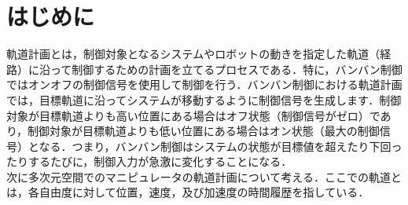 
\section{はじめに}
軌道計画とは，制御対象となるシステムやロボットの動きを指定した軌道（経路）に沿って制御するための計画を立てるプロセスである．特に，バンバン制御ではオンオフの制御信号を使用して制御を行う．バンバン制御における軌道計画では，目標軌道に沿ってシステムが移動するように制御信号を生成します．制御対象が目標軌道よりも高い位置にある場合はオフ状態（制御信号がゼロ）であり，制御対象が目標軌道よりも低い位置にある場合はオン状態（最大の制御信号）となる．つまり，バンバン制御はシステムの状態が目標値を超えたり下回ったりするたびに，制御入力が急激に変化することになる． \\

次に多次元空間でのマニピュレータの軌道計画について考える．ここでの軌道とは，各自由度に対して位置，速度，及び加速度の時間履歴を指している． 

